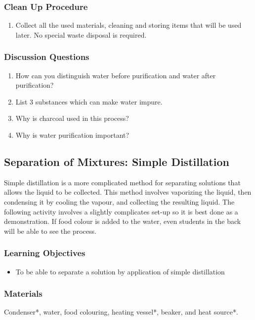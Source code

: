 \subsubsection*{Clean Up Procedure}
\begin{enumerate}
\item{Collect all the used materials, cleaning and storing items that will be used later. No special waste disposal is required.}
\end{enumerate}

\subsubsection*{Discussion Questions}
\begin{enumerate}
\item{How can you distinguish water before purification and water after purification?}
\item{List 3 substances which can make water impure.}
\item{Why is charcoal used in this process?}
\item{Why is water purification important?}
\end{enumerate}


\subsection{Separation of Mixtures: Simple Distillation}
Simple distillation is a more complicated method for separating solutions that allows the liquid to be collected. This method involves vaporizing the liquid, then condensing it by cooling the vapour, and collecting the resulting liquid.  The following activity involves a slightly complicates set-up so it is best done as a demonstration. If food colour is added to the water, even students in the back will be able to see the process.
\subsubsection*{Learning Objectives}
\begin{itemize}
\item{To be able to separate a solution by application of simple distillation}
\end{itemize}

\subsubsection*{Materials}
Condenser*, water, food colouring, heating vessel*, beaker, and heat source*.
